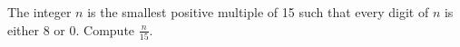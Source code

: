 The integer $n$ is the smallest positive multiple of 15 such that every digit of $n$ is either 8 or 0.  Compute $\frac{n}{15}$.